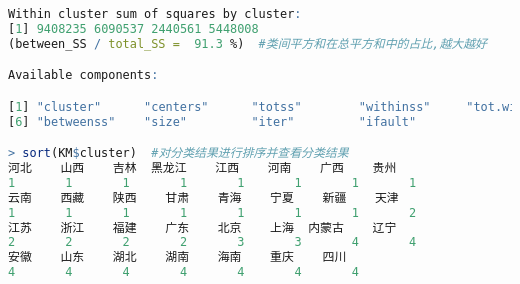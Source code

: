 \documentclass[11pt,a4paper,oneside]{book}
\begin{document}
\begin{lstlisting}[language=r]
Within cluster sum of squares by cluster:
[1] 9408235 6090537 2440561 5448008
(between_SS / total_SS =  91.3 %)  #类间平方和在总平方和中的占比,越大越好

Available components:

[1] "cluster"      "centers"      "totss"        "withinss"     "tot.withinss"
[6] "betweenss"    "size"         "iter"         "ifault"      

> sort(KM$cluster)  #对分类结果进行排序并查看分类结果
河北    山西    吉林  黑龙江    江西    河南    广西    贵州 
1       1       1       1       1       1       1       1 
云南    西藏    陕西    甘肃    青海    宁夏    新疆    天津 
1       1       1       1       1       1       1       2 
江苏    浙江    福建    广东    北京    上海  内蒙古    辽宁 
2       2       2       2       3       3       4       4 
安徽    山东    湖北    湖南    海南    重庆    四川 
4       4       4       4       4       4       4 
\end{lstlisting}
\end{document}
